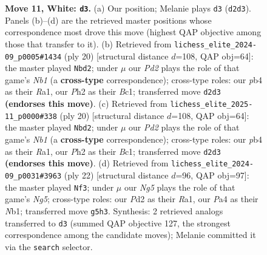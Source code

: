 \documentclass[11pt]{article}
\begin{document}
\begin{figure}[p]
\caption{\textbf{Move 11, White: \texttt{d3}.} (a) Our position; Melanie plays \texttt{d3} (\texttt{d2d3}). Panels (b)--(d) are the retrieved master positions whose correspondence most drove this move (highest QAP objective among those that transfer to it). (b) Retrieved from \texttt{lichess\_elite\_2024-09\_p0005\#1434} (ply 20) [structural distance $d$=108, QAP obj=64]: the master played \texttt{Nbd2}; under $\mu$ our \emph{Pd2} plays the role of that game's \emph{Nb1} (a \textbf{cross-type} correspondence); cross-type roles: our \emph{p}b4 as their \emph{R}a1, our \emph{P}h2 as their \emph{B}c1; transferred move \texttt{d2d3} \textbf{(endorses this move)}. (c) Retrieved from \texttt{lichess\_elite\_2025-11\_p0000\#338} (ply 20) [structural distance $d$=108, QAP obj=64]: the master played \texttt{Nbd2}; under $\mu$ our \emph{Pd2} plays the role of that game's \emph{Nb1} (a \textbf{cross-type} correspondence); cross-type roles: our \emph{p}b4 as their \emph{R}a1, our \emph{P}h2 as their \emph{B}c1; transferred move \texttt{d2d3} \textbf{(endorses this move)}. (d) Retrieved from \texttt{lichess\_elite\_2024-09\_p0031\#3963} (ply 22) [structural distance $d$=96, QAP obj=97]: the master played \texttt{Nf3}; under $\mu$ our \emph{Ng5} plays the role of that game's \emph{Ng5}; cross-type roles: our \emph{P}d2 as their \emph{R}a1, our \emph{P}a4 as their \emph{N}b1; transferred move \texttt{g5h3}. Synthesis: 2 retrieved analogs transferred to \texttt{d3} (summed QAP objective 127, the strongest correspondence among the candidate moves); Melanie committed it via the \texttt{search} selector.}
\label{fig:thought-m20}
\end{figure}

\clearpage
\end{document}

